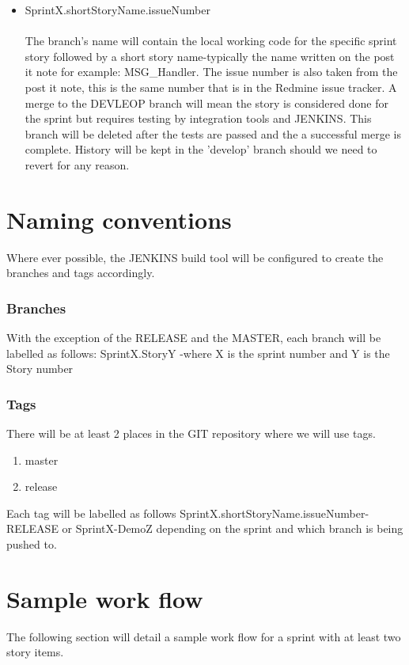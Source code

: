 \documentclass[11pt]{report}
\begin{document}
\begin{itemize}
\item SprintX.shortStoryName.issueNumber\\ \\
The branch's name will contain the local working code for the specific sprint story followed by a short story name-typically the name written on the post it note for example: MSG\_Handler. The issue number is also taken from the post it note, this is the same number that is in the Redmine issue tracker. A merge to the DEVLEOP branch will mean the story is considered done for the sprint but requires testing by integration tools and JENKINS. This branch will be deleted after the tests are passed and the a successful merge is complete. History will be kept in the 'develop' branch should we need to revert for any reason. 
\end{itemize}


\chapter{Naming conventions}
Where ever possible, the JENKINS build tool will be configured to create the branches and tags accordingly. 
\subsection{Branches}
With the exception of the RELEASE and the MASTER, each branch will be labelled as follows: SprintX.StoryY -where X is the sprint number and Y is the Story number
\subsection{Tags}
There will be at least 2 places in the GIT repository where we will use tags.
\begin{enumerate}
\item master
\item release
\end{enumerate}
Each tag will be labelled as follows SprintX.shortStoryName.issueNumber-RELEASE or SprintX-DemoZ depending on the sprint and which branch is being pushed to.


\chapter{Sample work flow}

The following section will detail a sample work flow for a sprint with at least two story items. 
\end{document}
